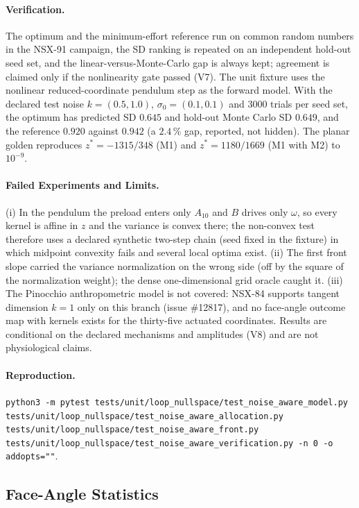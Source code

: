 \documentclass[11pt,a4paper]{article}
\begin{document}
\paragraph{Verification.}  The optimum and the minimum-effort reference run on
common random numbers in the NSX-91 campaign, the SD ranking is repeated on an
independent hold-out seed set, and the linear-versus-Monte-Carlo gap is always
kept; agreement is claimed only if the nonlinearity gate passed (V7).  The unit
fixture uses the nonlinear reduced-coordinate pendulum step as the forward
model.  With the declared test noise $k=(0.5,1.0)$, $\sigma_0=(0.1,0.1)$ and
$3000$ trials per seed set, the optimum has predicted SD $0.645$ and hold-out
Monte Carlo SD $0.649$, and the reference $0.920$ against $0.942$ (a $2.4\,\%$
gap, reported, not hidden).  The planar golden reproduces
$z^*=-1315/348$ (M1) and $z^*=1180/1669$ (M1 with M2) to $10^{-9}$.

\paragraph{Failed Experiments and Limits.}  (i) In the pendulum the preload
enters only $A_{10}$ and $B$ drives only $\omega$, so every kernel is affine in
$z$ and the variance is convex there; the non-convex test therefore uses a
declared synthetic two-step chain (seed fixed in the fixture) in which midpoint
convexity fails and several local optima exist.  (ii) The first front slope
carried the variance normalization on the wrong side (off by the square of the
normalization weight); the dense one-dimensional grid oracle caught it.  (iii) The
Pinocchio anthropometric model is not covered: NSX-84 supports tangent
dimension $k=1$ only on this branch (issue \#12817), and no face-angle outcome
map with kernels exists for the thirty-five actuated coordinates.  Results are
conditional on the declared mechanisms and amplitudes (V8) and are not
physiological claims.

\paragraph{Reproduction.}
\texttt{python3 -m pytest tests/unit/loop\_nullspace/test\_noise\_aware\_model.py
tests/unit/loop\_nullspace/test\_noise\_aware\_allocation.py
tests/unit/loop\_nullspace/test\_noise\_aware\_front.py
tests/unit/loop\_nullspace/test\_noise\_aware\_verification.py -n 0 -o addopts=""}.

\subsection{Face-Angle Statistics}
\label{sec:var-face}
\end{document}
